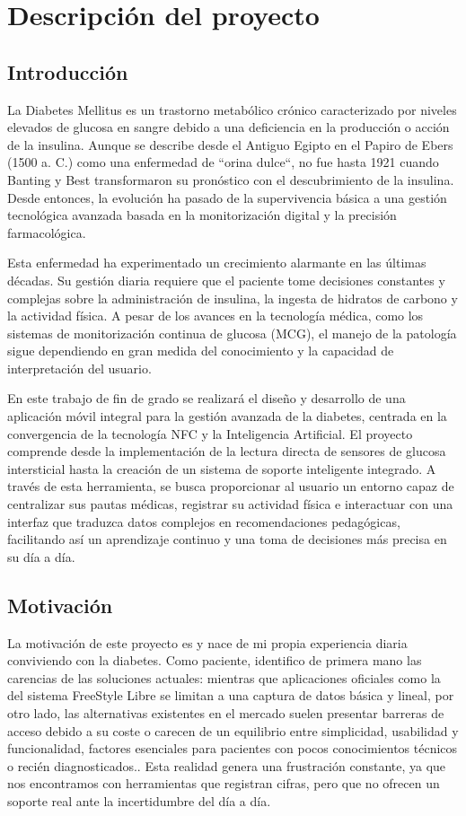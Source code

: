 \chapter{Descripción del proyecto}\label{cap:descripcion_del_proyecto}
\section{Introducción}
La Diabetes Mellitus es un trastorno metabólico crónico caracterizado por niveles elevados de glucosa en sangre debido a una deficiencia en la producción o acción de la insulina\cite{fede}. Aunque se describe desde el Antiguo Egipto en el Papiro de Ebers (1500 a. C.) como una enfermedad de ``orina dulce``, no fue hasta 1921 cuando Banting y Best transformaron su pronóstico  con el descubrimiento de la insulina. Desde entonces, la evolución ha pasado de la supervivencia básica a una gestión tecnológica avanzada basada en la monitorización digital y la precisión farmacológica.

Esta enfermedad ha experimentado un crecimiento alarmante en las últimas décadas. Su gestión diaria requiere que el paciente tome decisiones constantes y complejas sobre la administración de insulina, la ingesta de hidratos de carbono y la actividad física. A pesar de los avances en la tecnología médica, como los sistemas de monitorización continua de glucosa (MCG), el manejo de la patología sigue dependiendo en gran medida del conocimiento y la capacidad de interpretación del usuario.

En este trabajo de fin de grado se realizará el diseño y desarrollo de una aplicación móvil integral para la gestión avanzada de la diabetes, centrada en la convergencia de la tecnología NFC y la Inteligencia Artificial. El proyecto comprende desde la implementación de la lectura directa de sensores de glucosa intersticial hasta la creación de un sistema de soporte inteligente integrado. A través de esta herramienta, se busca proporcionar al usuario un entorno capaz de centralizar sus pautas médicas, registrar su actividad física e interactuar con una interfaz que traduzca datos complejos en recomendaciones pedagógicas, facilitando así un aprendizaje continuo y una toma de decisiones más precisa en su día a día.

\section{Motivación}
La motivación de este proyecto es  y nace de mi propia experiencia diaria conviviendo con la diabetes. Como paciente, identifico de primera mano las carencias de las soluciones actuales: mientras que aplicaciones oficiales como la del sistema FreeStyle Libre se limitan a una captura de datos básica y lineal, por otro lado, las alternativas existentes en el mercado suelen presentar barreras de acceso debido a su coste o carecen de un equilibrio entre simplicidad, usabilidad y funcionalidad, factores esenciales para pacientes con pocos conocimientos técnicos o recién diagnosticados.. Esta realidad genera una frustración constante, ya que nos encontramos con herramientas que registran cifras, pero que no ofrecen un soporte real ante la incertidumbre del día a día.

